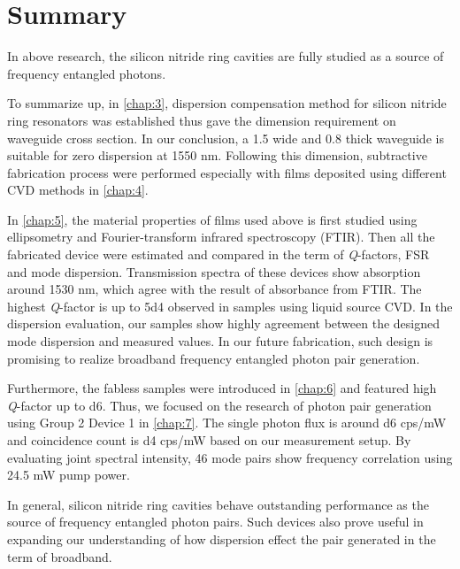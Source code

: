 
\chapter{Summary}

In above research, the silicon nitride ring cavities are fully studied as a source of frequency entangled photons. 

To summarize up, in \autoref{chap:3}, dispersion compensation method for silicon nitride ring resonators was established thus gave the dimension requirement on waveguide cross section. 
In our conclusion, a 1.5 \um wide and 0.8 \um thick waveguide is suitable for zero dispersion at 1550 nm.
Following this dimension, subtractive fabrication process were performed especially with films deposited using different CVD methods in \autoref{chap:4}. 

In \autoref{chap:5}, the material properties of films used above is first studied using ellipsometry and Fourier-transform infrared spectroscopy (FTIR). Then all the fabricated device were estimated and compared in the term of \textit{Q}-factors, FSR and mode dispersion. 
Transmission spectra of these devices show absorption around 1530 nm, which agree with the result of absorbance from FTIR.
The highest \textit{Q}-factor is up to \num{5d4} observed in samples using liquid source CVD. In the dispersion evaluation, our samples show highly agreement between the designed mode dispersion and measured values. In our future fabrication, such design is promising to realize broadband frequency entangled photon pair generation.

Furthermore, the fabless samples were introduced in \autoref{chap:6} and featured high \textit{Q}-factor up to \num{d6}. Thus, we focused on the research of photon pair generation using Group 2 Device 1 in \autoref{chap:7}. The single photon flux is around \num{d6} cps/mW and coincidence count is \num{d4} cps/mW based on our measurement setup. By evaluating joint spectral intensity, 46 mode pairs show frequency correlation using 24.5 mW pump power.

\newpage

In general, silicon nitride ring cavities behave outstanding performance as the source of frequency entangled photon pairs.
Such devices also prove useful in expanding our understanding of how dispersion effect the pair generated in the term of broadband.

\bigskip

